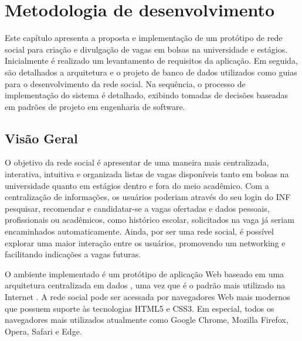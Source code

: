 \documentclass[cic,tc]{iiufrgs}
\begin{document}
\begin{table}[h]
\begin{adjustwidth}{-0.7in}{-0.7in}
\begin{center}
\begin{tabular}{lllll}
    \end{tabular}
    \end{center}
    \end{adjustwidth}
    \bigskip
    \label{tabelaAvalTrab}
\end{table}


\chapter{Metodologia de desenvolvimento}
\label{metodologiaDesenvolvimento}
Este capítulo apresenta a proposta e implementação de um protótipo de rede social para criação e divulgação de vagas em bolsas na universidade e estágios. Inicialmente é realizado um levantamento de requisitos da aplicação. Em seguida, são detalhados a arquitetura e o projeto de banco de dados utilizados como guias para o desenvolvimento da rede social. Na sequência, o processo de implementação do sistema é detalhado, exibindo tomadas de decisões baseadas em padrões de projeto em engenharia de software.

\section{Visão Geral}
\label{metodologiaVisaoGeral}
O objetivo da rede social é apresentar de uma maneira mais centralizada, interativa, intuitiva e organizada listas de vagas disponíveis tanto em bolsas na universidade quanto em estágios dentro e fora do meio acadêmico. Com a centralização de informações, os usuários poderiam através do seu login do INF pesquisar, recomendar e candidatar-se a vagas ofertadas e dados pessoais, profissionais ou acadêmicos, como histórico escolar, solicitados na vaga já seriam encaminhados automaticamente. Ainda, por ser uma rede social, é possível explorar uma maior interação entre os usuários, promovendo um networking e facilitando indicações a vagas futuras.

O ambiente implementado é um protótipo de aplicação Web baseado em uma arquitetura centralizada em dados \cite{pressman}, uma vez que é o padrão mais utilizado na Internet \cite{kurose}. A rede social pode ser acessada por navegadores Web mais modernos que possuem suporte às tecnologias HTML5 e CSS3. Em especial, todos os navegadores mais utilizados atualmente como Google Chrome, Mozilla Firefox, Opera, Safari e Edge.
\end{document}
